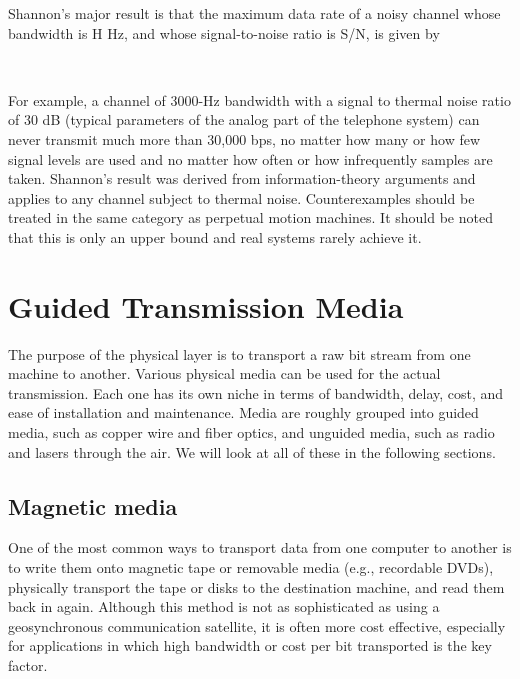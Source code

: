 \documentclass[b5paper,11pt]{memoir}
\begin{document}
Shannon's major result is that the maximum data rate of a noisy channel
whose bandwidth is {H} Hz, and whose signal-to-noise ratio is {S/N}, is
given by


~

For example, a channel of 3000-Hz bandwidth with a signal to thermal
noise ratio of 30 dB (typical parameters of the analog part of the
telephone system) can never transmit much more than 30,000 bps, no
matter how many or how few signal levels are used and no matter how
often or how infrequently samples are taken. Shannon's result was
derived from information-theory arguments and applies to any channel
subject to thermal noise. Counterexamples should be treated in the same
category as perpetual motion machines. It should be noted that this is
only an upper bound and real systems rarely achieve it.

\protect\hypertarget{0130661023_ch02lev1sec2.html}{}{}

\protect\hypertarget{0130661023_ch02lev1sec2.htmlux5cux23ch02lev1sec2}{}{}

\section{Guided Transmission Media}

The purpose of the physical layer is to transport a raw bit stream from
one machine to another. Various physical media can be used for the
actual transmission. Each one has its own niche in terms of bandwidth,
delay, cost, and ease of installation and maintenance. Media are roughly
grouped into guided media, such as copper wire and fiber optics, and
unguided media, such as radio and lasers through the air. We will look
at all of these in the following sections.

\protect\hypertarget{0130661023_ch02lev1sec2.htmlux5cux23ch02lev2sec4}{}{}

\subsection{Magnetic media}

One of the most common ways to transport data from one computer to
another is to write them onto magnetic tape or removable media (e.g.,
recordable DVDs), physically transport the tape or disks to the
destination machine, and read them back in again. Although this method
is not as sophisticated as using a geosynchronous communication
satellite, it is often more cost effective, especially for applications
in which high bandwidth or cost per bit transported is the key factor.
\end{document}
